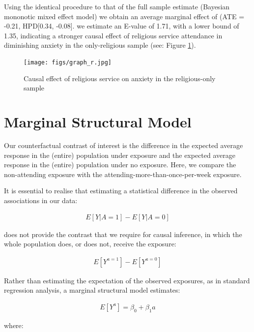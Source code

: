 \documentclass[]{interact}
\theoremstyle{plain}%
\theoremstyle{definition}
\theoremstyle{remark}
\begin{document}
Using the identical procedure to that of the full sample estimate (Bayesian mononotic mixed effect model) we obtain an average marginal effect of (ATE = -0.21, HPD[0.34, -0.08]. we estimate an E-value of 1.71, with a lower bound of 1.35, indicating a stronger causal effect of religious service attendance in diminishing anxiety in the only-religious sample (see: Figure \ref{fig:graphR}).


\begin{figure}[h!bt]
\centering
    \caption{Causal effect of religious service on anxiety in the religious-only sample}
    \texttt{[image: figs/graph\_r.jpg]}
    \label{fig:graphR}
\end{figure}


\newpage
\section{Marginal Structural Model}
\label{app:margmod}


Our counterfactual contrast of interest is the difference in the expected average response in the (entire) population under exposure and the expected average response in the (entire) population under no exposure. Here, we compare the non-attending exposure with the attending-more-than-once-per-week exposure. %

It is essential to realise that estimating a statistical difference in the observed associations in our data:

$$
\begin{aligned}
E[Y|A=1]-E[Y|A=0]
\end{aligned}
$$

does not provide the contrast that we require for causal inference, in which the whole population does, or does not, receive the exposure:


$$
\begin{aligned}
E[Y^{a=1}] - E[Y^{a=0}]
\end{aligned}
$$


Rather than estimating the expectation of the observed exposures, as in standard regression analysis, a marginal structural model estimates:

$$
\begin{aligned}
E[Y^a] = \beta_0 + \beta_1a 
\end{aligned}
$$

where:
\end{document}
